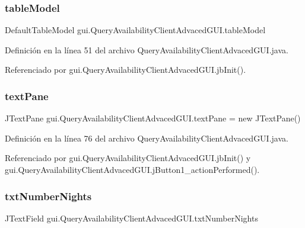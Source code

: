\subsubsection{\texorpdfstring{tableModel}{tableModel}}
{\footnotesize\ttfamily Default\+Table\+Model gui.\+Query\+Availability\+Client\+Advaced\+G\+U\+I.\+table\+Model\hspace{0.3cm}{\ttfamily [private]}}



Definición en la línea 51 del archivo Query\+Availability\+Client\+Advaced\+G\+U\+I.\+java.



Referenciado por gui.\+Query\+Availability\+Client\+Advaced\+G\+U\+I.\+jb\+Init().

\mbox{\label{classgui_1_1_query_availability_client_advaced_g_u_i_a69be3a2280f523fa654142a373a5779c}} 
\subsubsection{\texorpdfstring{textPane}{textPane}}
{\footnotesize\ttfamily J\+Text\+Pane gui.\+Query\+Availability\+Client\+Advaced\+G\+U\+I.\+text\+Pane = new J\+Text\+Pane()\hspace{0.3cm}{\ttfamily [private]}}



Definición en la línea 76 del archivo Query\+Availability\+Client\+Advaced\+G\+U\+I.\+java.



Referenciado por gui.\+Query\+Availability\+Client\+Advaced\+G\+U\+I.\+jb\+Init() y gui.\+Query\+Availability\+Client\+Advaced\+G\+U\+I.\+j\+Button1\+\_\+action\+Performed().

\mbox{\label{classgui_1_1_query_availability_client_advaced_g_u_i_a166fd224a2434ae9bfdda92583163825}} 
\subsubsection{\texorpdfstring{txtNumberNights}{txtNumberNights}}
{\footnotesize\ttfamily J\+Text\+Field gui.\+Query\+Availability\+Client\+Advaced\+G\+U\+I.\+txt\+Number\+Nights\hspace{0.3cm}{\ttfamily [private]}}



